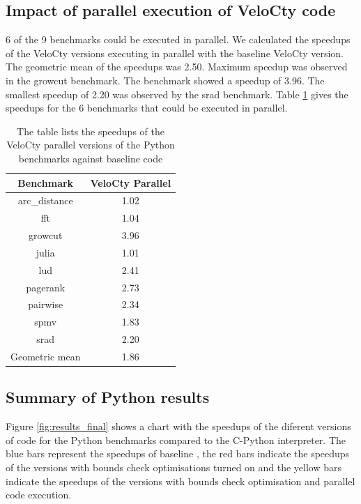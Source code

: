 \subsection{Impact of parallel execution of VeloCty code}
6 of the 9 benchmarks could be executed in parallel. We calculated the speedups of the VeloCty versions executing in parallel with the baseline VeloCty version. The geometric mean of the speedups was 2.50. Maximum speedup was observed in the growcut benchmark. The benchmark showed a speedup of 3.96. The smallest speedup of 2.20  was observed by the srad benchmark. Table \ref{tab:cpvscwopy} gives the speedups for the 6 benchmarks that could be executed in parallel.
\begin{table}[h]
\centering
\begin{tabular}{|c|c|}
\hline
Benchmark      & VeloCty Parallel \\ \hline
arc\_distance  & 1.02             \\ \hline
fft            & 1.04             \\ \hline
growcut        & 3.96             \\ \hline
julia          & 1.01             \\ \hline
lud            & 2.41             \\ \hline
pagerank       & 2.73             \\ \hline
pairwise       & 2.34             \\ \hline
spmv           & 1.83             \\ \hline
srad           & 2.20             \\ \hline
Geometric mean & 1.86             \\ \hline
\end{tabular}
\caption[Speedup of VeloCty parallel for Python]{The table lists the speedups of the VeloCty parallel versions of the Python benchmarks against baseline \velocty code}
\label{tab:cpvscwopy}
\end{table}

\subsection{Summary of Python results}
Figure \ref{fig:results_final} shows a chart with the speedups of the diferent versions of \velocty code for the Python benchmarks compared to the C-Python interpreter. The blue bars represent the speedups of baseline \velocty, the red bars indicate the speedups of the \velocty versions with bounds check optimisations turned on and the yellow bars indicate the speedups of the \velocty versions with bounds check optimisation and parallel code execution. 

